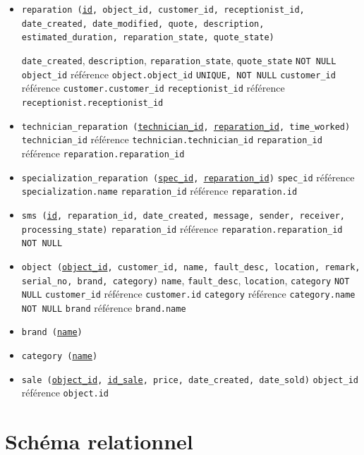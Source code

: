\documentclass{article}
\newcommand{\ul}{\underline}
\newcommand{\ttt}{\texttt}
\begin{document}
\begin{itemize}
    \item \ttt{reparation (\ul{id}, object\_id, customer\_id, receptionist\_id, date\_created, date\_modified, quote, description, estimated\_duration, reparation\_state, quote\_state)}
    
    \subitem \ttt{date\_created}, \ttt{description}, \ttt{reparation\_state}, \ttt{quote\_state} \ttt{NOT NULL}
    \subitem \ttt{object\_id} référence \ttt{object.object\_id} \ttt{UNIQUE, NOT NULL}
    \subitem \ttt{customer\_id} référence \ttt{customer.customer\_id} 
    \subitem \ttt{receptionist\_id} référence \ttt{receptionist.receptionist\_id} 

    \item \ttt{technician\_reparation (\ul{technician\_id}, \ul{reparation\_id}, {time\_worked})}
    \subitem \ttt{technician\_id} référence \ttt{technician.technician\_id} 
    \subitem \ttt{reparation\_id} référence \ttt{reparation.reparation\_id}

    \item \ttt{specialization\_reparation (\ul{spec\_id}, \ul{reparation\_id})}
    \subitem \ttt{spec\_id} référence \ttt{specialization.name}
    \subitem \ttt{reparation\_id} référence \ttt{reparation.id}

    \item \ttt{sms (\ul{id}, reparation\_id, date\_created, message, sender, receiver, processing\_state)}
    \subitem \ttt{reparation\_id} référence \ttt{reparation.reparation\_id} \ttt{NOT NULL}

    \item \ttt{object (\ul{object\_id}, customer\_id, name, fault\_desc, location, remark, serial\_no, brand, category)}
    \subitem \ttt{name}, \ttt{fault\_desc}, \ttt{location}, \ttt{category} \ttt{NOT NULL}
    \subitem \ttt{customer\_id} référence \ttt{customer.id}
    \subitem \ttt{category} référence \ttt{category.name} \ttt{NOT NULL}
    \subitem \ttt{brand} référence \ttt{brand.name}

    \item \ttt{brand (\ul{name})}
    \item \ttt{category (\ul{name})}
    \item \ttt{sale (\ul{object\_id}, \ul{id\_sale}, price, date\_created, date\_sold)}
    \subitem \ttt{object\_id} référence \ttt{object.id}

\end{itemize}

\section{Schéma relationnel}
\end{document}
